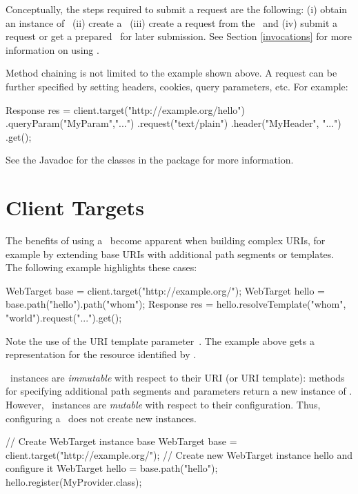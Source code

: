 Conceptually, the steps required to submit a request are the following: (i) obtain an instance of \Client\ (ii) create a \WebTarget\ (iii) create a request from the \WebTarget\ and (iv) submit a request or get a prepared \Invocation\ for later submission. See Section \ref{invocations} for more information on using \Invocation.

Method chaining is not limited to the example shown above. A request can be further specified by setting headers, cookies, query parameters, etc. For example:

\begin{listing}{1}
Response res = client.target("http://example.org/hello")
    .queryParam("MyParam","...")
    .request("text/plain")
    .header("MyHeader", "...")
    .get();
\end{listing}

See the Javadoc for the classes in the  package for more information.

\section{Client Targets}

The benefits of using a \WebTarget\ become apparent when building complex URIs, for example by extending base URIs with additional path segments or templates. The following example highlights these cases:

\begin{listing}{1}
WebTarget base = client.target("http://example.org/");
WebTarget hello = base.path("hello").path("{whom}");   
Response res = hello.resolveTemplate("whom", "world").request("...").get();
\end{listing}

Note the use of the URI template parameter~. The example above gets a representation for the resource identified by .

\WebTarget\ instances are {\em immutable} with respect to their URI (or URI template): methods for specifying additional path segments and parameters return a new instance of \WebTarget. However, \WebTarget\ instances are {\em mutable} with respect to their configuration. Thus, configuring a \WebTarget\ does not create new instances.

\begin{listing}{1}
// Create WebTarget instance base
WebTarget base = client.target("http://example.org/");
// Create new WebTarget instance hello and configure it
WebTarget hello = base.path("hello");
hello.register(MyProvider.class);
\end{listing}

